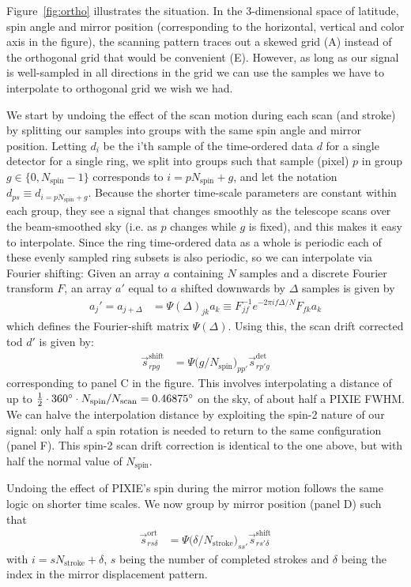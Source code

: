 \documentclass{article}
\begin{document}
Figure~\ref{fig:ortho} illustrates the situation. In the 3-dimensional
space of latitude, spin angle and mirror position (corresponding to the
horizontal, vertical and color axis in the figure), the scanning pattern
traces out a skewed grid (A) instead of the orthogonal grid
that would be convenient (E). However, as long as our signal is well-sampled
in all directions in the grid we can use the samples we have to
interpolate to orthogonal grid we wish we had.

We start by undoing the effect of the scan motion during each scan (and stroke)
by splitting our samples into groups with the same spin angle and mirror position.
Letting $d_i$ be the i'th sample of the time-ordered data $d$ for a single detector
for a single ring, we split into groups such that
sample (pixel) $p$ in group $g \in \{0,N_\textrm{spin}-1\}$ corresponds to
$i = pN_\textrm{spin}+g$, and let the notation $d_{ps} \equiv d_{i=pN_\textrm{spin}+g}$.
Because the shorter time-scale parameters are constant within each group, they see
a signal that changes smoothly as the telescope scans over the beam-smoothed sky
(i.e. as $p$ changes while $g$ is fixed),
and this makes it easy to interpolate. Since the ring time-ordered data as a whole
is periodic each of these evenly sampled ring subsets is also periodic, so we
can interpolate via Fourier shifting: Given an array $a$ containing $N$ samples and a discrete Fourier transform $F$,
an array $a'$ equal to $a$ shifted downwards by $\Delta$ samples is given by
\begin{align}
	a_j' = a_{j+\Delta} &= \Psi(\Delta)_{jk} a_k \equiv F^{-1}_{jf} e^{-2\pi if\Delta/N} F_{fk} a_k
\end{align}
which defines the Fourier-shift matrix $\Psi(\Delta)$. Using this,
the scan drift corrected tod $d'$ is given by:
\begin{align}
	\vec s^\textrm{shift}_{rpg} &= \Psi\big(g/N_\textrm{spin}\big)_{pp'} \vec s^\textrm{det}_{rp'g}
\end{align}
corresponding to panel C in the figure. This involves interpolating
a distance of up to $\frac12\cdot 360\degree\cdot N_\textrm{spin}/N_\textrm{scan}
= 0.46875\degree$ on the sky, of about half a PIXIE FWHM. We can halve the
interpolation distance by exploiting the spin-2 nature of our signal:
only half a spin rotation is needed to return to the same configuration (panel F).
This spin-2 scan drift correction is identical to the one above, but with
half the normal value of $N_\textrm{spin}$.

Undoing the effect of PIXIE's spin during the mirror motion follows the same
logic on shorter time scales. We now group by mirror position (panel D)
such that
\begin{align}
	\vec s^\textrm{ort}_{rs\delta} &= \Psi\big(\delta/N_\textrm{stroke}\big)_{ss'} \vec s^\textrm{shift}_{rs'\delta}
\end{align}
with $i = sN_\textrm{stroke}+\delta$, $s$ being the number of completed strokes
and $\delta$ being the index in the mirror displacement pattern.
\end{document}
